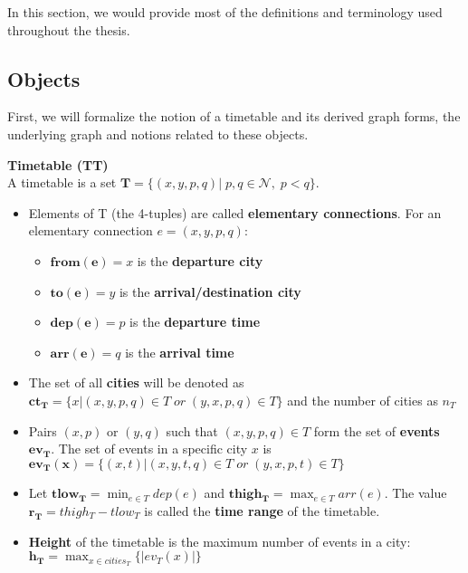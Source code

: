 In this section, we would provide most of the definitions and terminology used throughout the thesis. 

	\subsection{Objects}

	First, we will formalize the notion of a timetable and its derived graph forms, the underlying graph and notions related to these objects.
	
	\begin{definition}
        \textbf{Timetable (TT)} \\
        A timetable is a set $\bm{T} = \{(x, y, p, q)| \; p, q \in \mathcal{N}, \; p < q \}$.
        \begin{itemize}
        	\item Elements of T (the 4-tuples) are called \textbf{elementary connections}. For an elementary connection $e = (x, y, p, q)$:
        	\begin{itemize}
        		\item $\bm{from(e)} = x$ is the \textbf{departure city}
        		\item $\bm{to(e)} = y$ is the \textbf{arrival/destination city}
        		\item $\bm{dep(e)} = p$ is the \textbf{departure time}
        		\item $\bm{arr(e)} = q$ is the \textbf{arrival time}
        	\end{itemize}
        	\item The set of all \textbf{cities} will be denoted as $\bm{ct_{T}} = \{x| (x, y, p, q) \in T \; or \; (y, x, p, q) \in T\}$ and the number of cities as $n_{T}$
        	\item Pairs $(x, p)$ or $(y, q)$ such that $(x, y, p, q) \in T$ form the set of \textbf{events} $\bm{ev_{T}}$. The set of events in a specific city $x$ is $\bm{ev_{T}(x)} = \{(x, t)| (x, y, t, q) \in T \; or \; (y, x, p, t) \in T\}$
        	\item Let $\bm{tlow_{T}} = \min_{e \in T} dep(e)$ and $\bm{thigh_{T}} = \max_{e \in T} arr(e)$. The value $\bm{r_{T}} = thigh_{T} - tlow_{T}$ is called the \textbf{time range} of the timetable.
        	\item \textbf{Height} of the timetable is the maximum number of events in a city: $\bm{h_{T}} = \max_{x \in cities_{T}} \{|ev_{T}(x)|\}$
        \end{itemize}
    \end{definition}
    

